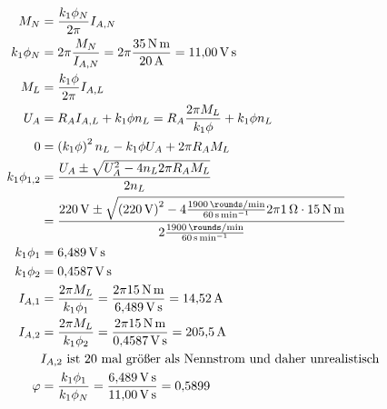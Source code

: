 \documentclass[11pt,a4paper]{scrartcl}
\newcommand{\mybr}[1]{\left(#1\right)}
\newcommand{\0}{_{\mybr{0}}}
\newcommand{\1}{_{\mybr{1}}}
\newcommand{\2}{_{\mybr{2}}}
\begin{document}
\section{}
\begin{align}
M_N&=\frac{k_1 \phi_N}{2\pi} I_{A,N}\\
k_1\phi_N&=2\pi\frac{M_N}{I_{A,N}}=2\pi\frac{\SI{35}{\newton\metre}}{\SI{20}{\ampere}}=\SI{11.00}{\volt\second}\\
M_L&=\frac{k_1 \phi}{2\pi} I_{A,L}\\
U_A&=R_A I_{A,L}+k_1\phi n_L=R_A \frac{2\pi M_L}{k_1\phi}+k_1\phi n_L\\
0&=\mybr{k_1\phi}^2 n_L - k_1 \phi U_A + 2\pi R_A M_L\\
k_1\phi_{1,2}&=\frac{U_A\pm\sqrt{U_A^2-4n_L 2 \pi R_A M_L}}{2 n_L}\\
&=\frac{\SI{220}{\volt}\pm\sqrt{\mybr{\SI{220}{\volt}}^2-4\frac{\SI{1900}{\rounds\per\minute}}{\SI{60}{\second\per\minute}}2\pi\SI{1}{\ohm}\cdot\SI{15}{\newton\metre}}}{2\frac{\SI{1900}{\rounds\per\minute}}{\SI{60}{\second\per\minute}}}\\
k_1\phi_1&=\SI{6.489}{\volt\second}\\
k_1\phi_2&=\SI{0.4587}{\volt\second}\\
I_{A,1}&=\frac{2\pi M_L}{k_1\phi_1}=\frac{2\pi\SI{15}{\newton\metre}}{\SI{6.489}{\volt\second}}=\SI{14.52}{\ampere}\\
I_{A,2}&=\frac{2\pi M_L}{k_1\phi_2}=\frac{2\pi\SI{15}{\newton\metre}}{\SI{0.4587}{\volt\second}}=\SI{205.5}{\ampere}\\
&\text{$I_{A,2}$ ist 20 mal größer als Nennstrom und daher unrealistisch}\\
\varphi&=\frac{k_1\phi_1}{k_1\phi_N}=\frac{\SI{6.489}{\volt\second}}{\SI{11.00}{\volt\second}}=\num{0.5899}
\end{align}

\section{}
\end{document}
